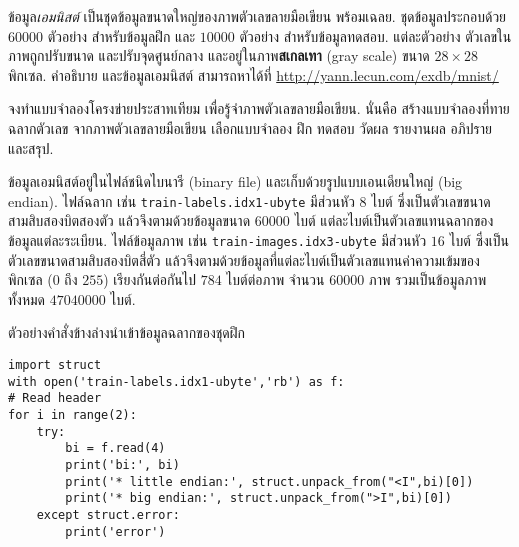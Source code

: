 \begin{Exercise}
\label{ex: mnist}

ข้อมูล\textit{เอมนิสต์}\cite{LeCunEtAl1990a}
เป็นชุดข้อมูลขนาดใหญ่ของภาพตัวเลขลายมือเขียน พร้อมเฉลย.
ชุดข้อมูลประกอบด้วย
$60000$ ตัวอย่าง สำหรับข้อมูลฝึก
และ $10000$ ตัวอย่าง สำหรับข้อมูลทดสอบ.
แต่ละตัวอย่าง ตัวเลขในภาพถูกปรับขนาด และปรับจุดศูนย์กลาง และอยู่ในภาพ\textbf{สเกลเทา} (gray scale)
ขนาด $28 \times 28$ พิกเซล.
%
คำอธิบาย และข้อมูลเอมนิสต์ 
สามารถหาได้ที่
\url{http://yann.lecun.com/exdb/mnist/}

จงทำแบบจำลองโครงข่ายประสาทเทียม
เพื่อรู้จำภาพตัวเลขลายมือเขียน.
นั่นคือ สร้างแบบจำลองที่ทายฉลากตัวเลข จากภาพตัวเลขลายมือเขียน
เลือกแบบจำลอง ฝึก ทดสอบ วัดผล
รายงานผล อภิปราย และสรุป.


ข้อมูลเอมนิสต์อยู่ในไฟล์ชนิดไบนารี (binary file)
และเก็บด้วยรูปแบบเอนเดียนใหญ่ (big endian).
ไฟล์ฉลาก เช่น \verb|train-labels.idx1-ubyte|
มีส่วนหัว $8$ ไบต์ ซึ่งเป็นตัวเลขขนาดสามสิบสองบิตสองตัว
แล้วจึงตามด้วยข้อมูลขนาด $60000$ ไบต์ 
แต่ละไบต์เป็นตัวเลขแทนฉลากของข้อมูลแต่ละระเบียน.
ไฟล์ข้อมูลภาพ เช่น \verb|train-images.idx3-ubyte|
มีส่วนหัว $16$ ไบต์ ซึ่งเป็นตัวเลขขนาดสามสิบสองบิตสี่ตัว
แล้วจึงตามด้วยข้อมูลที่แต่ละไบต์เป็นตัวเลขแทนค่าความเข้มของพิกเซล ($0$ ถึง $255$)
เรียงกันต่อกันไป $784$ ไบต์ต่อภาพ จำนวน $60000$ ภาพ
รวมเป็นข้อมูลภาพทั้งหมด $47040000$ ไบต์.

ตัวอย่างคำสั่งข้างล่างนำเข้าข้อมูลฉลากของชุดฝึก
\begin{Verbatim}[fontsize=\small]
import struct
with open('train-labels.idx1-ubyte','rb') as f:
# Read header
for i in range(2):
    try:
        bi = f.read(4)
        print('bi:', bi)
        print('* little endian:', struct.unpack_from("<I",bi)[0])
        print('* big endian:', struct.unpack_from(">I",bi)[0])
    except struct.error:
        print('error')


\end{Verbatim}
\end{Exercise}
